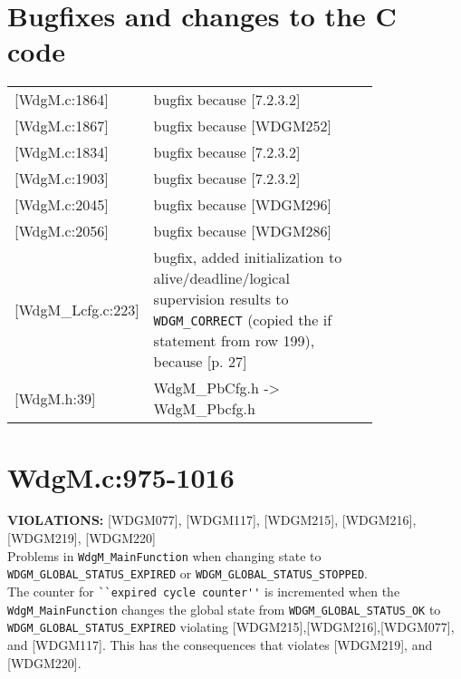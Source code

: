\documentclass[11pt,a4paper]{article}
\begin{document}
\section{Bugfixes and changes to the C code}
\begin{longtable}{l p{0.8\linewidth}}

[WdgM.c:1864] & bugfix because [7.2.3.2]\\

[WdgM.c:1867] & bugfix because [WDGM252]\\

[WdgM.c:1834] & bugfix because [7.2.3.2]\\

[WdgM.c:1903] & bugfix because [7.2.3.2]\\

[WdgM.c:2045] & bugfix because [WDGM296]\\

[WdgM.c:2056] & bugfix because [WDGM286]\\

[WdgM\_Lcfg.c:223] & bugfix, added initialization to alive/deadline/logical supervision results to \verb!WDGM_CORRECT! (copied the if statement from row 199), because [p. 27]\\

[WdgM.h:39] & WdgM\_PbCfg.h -> WdgM\_Pbcfg.h\\
\end{longtable}

\newpage
\lstset{language=c}
\lstset{language=autosar}

\section{WdgM.c:975-1016}
\textbf{VIOLATIONS:} [WDGM077], [WDGM117], [WDGM215], [WDGM216], [WDGM219],
[WDGM220]\\[0.5cm]

Problems in \lstinline!WdgM_MainFunction! when changing state to
\lstinline!WDGM_GLOBAL_STATUS_EXPIRED! or
\lstinline!WDGM_GLOBAL_STATUS_STOPPED!.\\[0.5cm]
The counter for \lstinline!``expired cycle counter''! is incremented when the
\lstinline!WdgM_MainFunction! changes the global state from
\lstinline!WDGM_GLOBAL_STATUS_OK! to \lstinline!WDGM_GLOBAL_STATUS_EXPIRED!
violating [WDGM215],[WDGM216],[WDGM077], and [WDGM117].
This has the consequences that violates [WDGM219], and [WDGM220].\\
\end{document}
